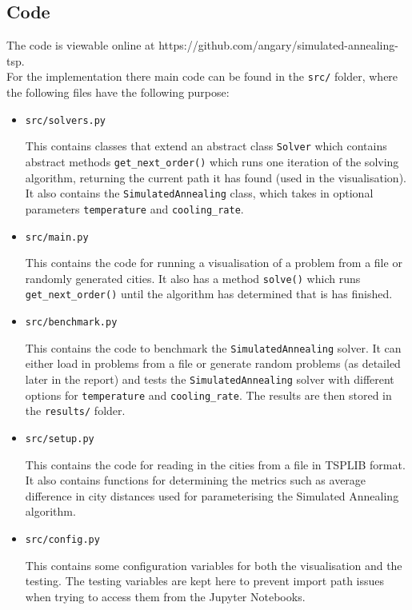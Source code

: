 \documentclass{article}
\begin{document}
\newpage
\subsection{Code}

The code is viewable online at https://github.com/angary/simulated-annealing-tsp.
\\

For the implementation there main code can be found in the \texttt{src/} folder, where the following files have the following purpose:

\begin{itemize}
    \item \texttt{src/solvers.py} 
    
    This contains classes that extend an abstract class \texttt{Solver} which contains abstract methods \texttt{get\_next\_order()} which runs one iteration of the solving algorithm, returning the current path it has found (used in the visualisation).
    It also contains the \texttt{SimulatedAnnealing} class, which takes in optional parameters \texttt{temperature} and \texttt{cooling\_rate}.
    
    \item \texttt{src/main.py} 
    
    This contains the code for running a visualisation of a problem from a file or randomly generated cities.
    It also has a method \texttt{solve()} which runs \texttt{get\_next\_order()} until the algorithm has determined that is has finished.
    
    \item \texttt{src/benchmark.py}
    
    This contains the code to benchmark the \texttt{SimulatedAnnealing} solver.
    It can either load in problems from a file or generate random problems (as detailed later in the report) and tests the \texttt{SimulatedAnnealing} solver with different options for \texttt{temperature} and \texttt{cooling\_rate}.
    The results are then stored in the \texttt{results/} folder.
    
    \item \texttt{src/setup.py}
    
    This contains the code for reading in the cities from a file in TSPLIB format.
    It also contains functions for determining the metrics such as average difference in city distances used for parameterising the Simulated Annealing algorithm.
    
    \item \texttt{src/config.py}
    
    This contains some configuration variables for both the visualisation and the testing.
    The testing variables are kept here to prevent import path issues when trying to access them from the Jupyter Notebooks.
    
\end{itemize}
\end{document}
